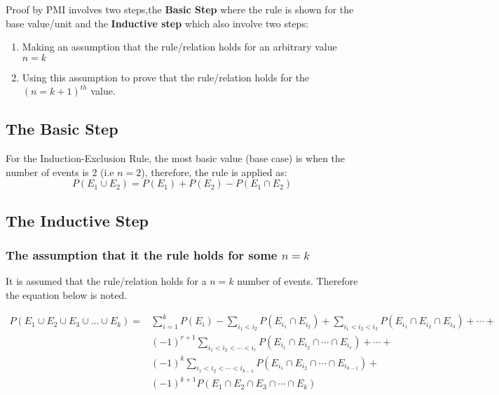 \documentclass[a4paper]{article}
\begin{document}
    Proof by PMI involves two steps,the \textbf{Basic Step} where the rule is shown for the base value/unit and the \textbf{Inductive step} which also involve two steps:
    \begin{enumerate}
        \item {Making an assumption that the rule/relation holds for an arbitrary value $n = k$}
        \item {Using this assumption to prove that the rule/relation holds for the ${(n = k + 1)}^{th}$ value.}
    \end{enumerate}

    \subsection{The Basic Step}
    For the Induction-Exclusion Rule, the most basic value (base case) is when the number of events is $2$ (i.e $n = 2$), therefore, the rule is applied as:
    \begin{equation} \label{base_case}
        P(E_1 \cup E_2) = P(E_1) + P(E_2) - P(E_1 \cap E_2)
    \end{equation}
    \subsection{The Inductive Step}
    \subsubsection*{The assumption that it the rule holds for some $n = k$}
    It is assumed that the rule/relation holds for a $n = k$ number of events. Therefore the equation below is noted.

    \begin{equation} \label{kth_rule}
        \begin{split}
            P(E_1 \cup E_2 \cup E_3 \cup \dots \cup E_k) = & \sum_{i = 1}^{k} P(E_i) - \sum_{i_1 < i_2} P(E_{i_1} \cap E_{i_2}) + \sum_{i_1 < i_2 < i_3} P(E_{i_1} \cap E_{i_2} \cap E_{i_3}) + \cdots + \\
            & {(-1)}^{r + 1} \sum_{i_1 < i_2 < \cdots < i_r} P(E_{i_1} \cap E_{i_2} \cap \cdots \cap E_{i_r}) + \cdots + \\
            & {(-1)}^{k} \sum_{i_1 < i_2 < \cdots < i_{k-1}} P(E_{i_1} \cap E_{i_2} \cap \cdots \cap E_{i_{k-1}}) + \\
            & {(-1)}^{k + 1} P(E_1 \cap E_2 \cap E_3 \cap \cdots \cap E_k)
        \end{split}
    \end{equation}
\end{document}
